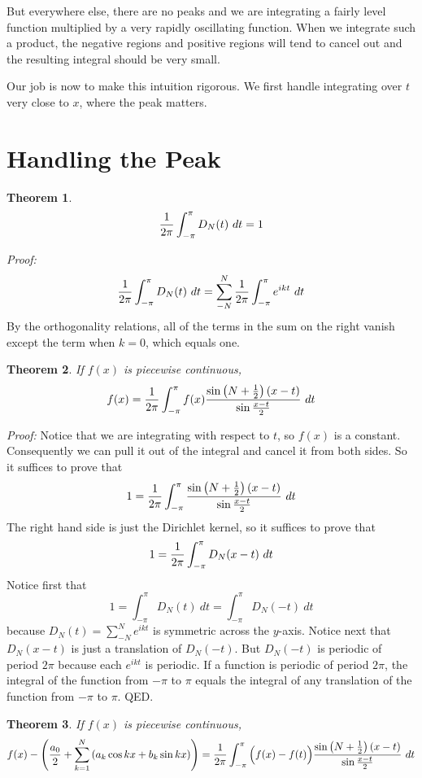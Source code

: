 \documentclass[11pt, oneside]{article}   	%
\newtheorem{theorem}{Theorem}
\begin{document}
But everywhere else, there are no peaks and we are integrating a fairly level function multiplied by a very rapidly oscillating function. When we integrate such a product, the negative regions and positive regions will tend to cancel out and the resulting integral should be very small.

Our job is now to make this intuition rigorous. We first handle integrating over $t$ very close to $x$, where the peak matters.

\section{Handling the Peak}


\begin{theorem}
\[{1 \over {2 \pi}} \int_{- \pi}^\pi D_N(t)\ dt = 1\]
\end{theorem}

{\em Proof:}
	\[{1 \over {2 \pi}} \int_{- \pi}^\pi D_N(t)\ dt = \sum_{-N}^N {1 \over {2 \pi}} \int_{- \pi}^\pi e^{ikt} \ dt\]
	By the orthogonality relations, all of the terms in the sum on the right vanish except the term when $k = 0$, which equals one.

\begin{theorem} If $f(x)$ is piecewise continuous,
\[f(x) =  {1 \over {2 \pi}} \int_{- \pi}^\pi f(x)  {{\sin \left(N + {1 \over 2}\right)(x - t)} \over {\sin {{x - t} \over 2}}} \ dt\]
\end{theorem}

{\em Proof:} Notice that we are integrating with respect to $t$, so $f(x)$ is a constant. Consequently we can pull it out of the integral and cancel it from both sides. So it suffices to prove that
\[1 = {1 \over {2 \pi}} \int_{- \pi}^\pi  {{\sin \left(N + {1 \over 2}\right)(x - t)} \over {\sin {{x - t} \over 2}}} \ dt\]
The right hand side is just the Dirichlet kernel, so it suffices to prove that
\[1 = {1 \over {2 \pi}} \int_{-\pi}^\pi D_N(x - t)\ dt\]
Notice first that 
\[1 = \int_{- \pi}^\pi D_N(t) \ dt = \int_{- \pi}^\pi D_N(-t) \ dt\]
because $D_N(t) = \sum_{-N}^N e^{ikt}$ is symmetric across the $y$-axis. Notice next that $D_N(x - t)$ is just a translation of $D_N(-t)$. But $D_N(-t)$ is periodic of period $2 \pi$ because each $e^{ikt}$ is periodic. If a function is periodic of period $2 \pi$, the integral of the function from $- \pi$ to $\pi$ equals the integral of any translation of the function from $-\pi$ to $\pi$. QED.

\begin{theorem} If $f(x)$ is piecewise continuous,
\[f(x) - \left({{a_0} \over 2} + \sum_{k = 1}^N \left( a_k \cos kx + b_k \sin kx \right)\right) =  {1 \over {2 \pi}} \int_{- \pi}^\pi \Big( f(x) - f(t)\Big) {{\sin \left(N + {1 \over 2}\right)(x - t)} \over {\sin {{x - t} \over 2}}} \ dt\]
\end{theorem}
\end{document}
